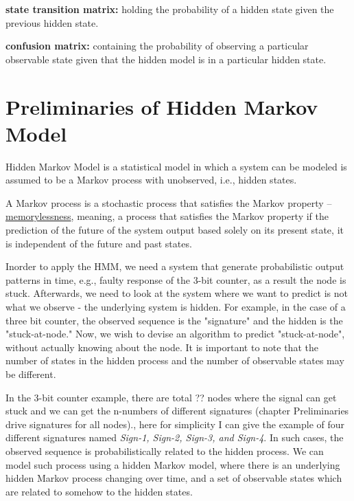 \textbf{state transition matrix:}  holding the probability of a hidden state given the previous hidden state.

\textbf{confusion matrix:} containing the probability of observing a particular observable state given that the hidden model is in a particular hidden state. 


\section{Preliminaries of Hidden Markov Model}


Hidden Markov Model is a statistical model in which a system can be modeled is assumed to be a Markov process with unobserved, i.e., hidden states. 

\begin{tcolorbox}[width=\textwidth,colback={gray},title={Markov Process},colbacktitle=gray,coltitle=black]  

A Markov process  is a stochastic process that satisfies the Markov property -- \underline{memorylessness}, meaning, a process that satisfies the Markov property if the prediction of the future of the system output based solely on its present state, it is independent of the future and past states.   
\end{tcolorbox}


Inorder to apply the HMM, we need a system that generate probabilistic output patterns in time, e.g., faulty response of the 3-bit counter, as a result the node is stuck. Afterwards, we need to look at the system where we want to predict is not what we observe -  the underlying system is hidden. For example, in the case of a three bit counter, the observed sequence is the "signature" and the hidden is the "stuck-at-node." Now, we wish to devise an algorithm to predict "stuck-at-node", without actually knowing about the node. It is important to note that the number of states in the hidden process and the number of observable states may be different. 


In the 3-bit counter example, there are total ?? nodes where the signal can get stuck and we can get the n-numbers of different signatures (chapter Preliminaries drive signatures for all nodes)., here for simplicity I can give the example of four different signatures named \textit{Sign-1, Sign-2, Sign-3, and Sign-4}. In such cases, the observed sequence is probabilistically related to the hidden process. We can model such process using a hidden Markov model, where there is an underlying hidden Markov process changing over time, and a set of observable states which are related to somehow to the hidden states.


